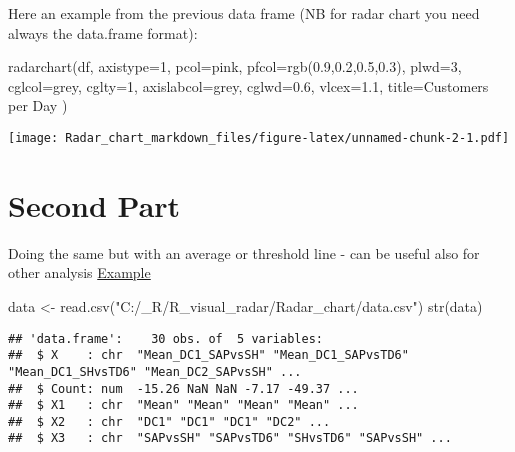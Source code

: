 \documentclass[
]{article}
\newenvironment{Shaded}{\begin{snugshade}}{\end{snugshade}}
\newcommand{\AttributeTok}[1]{\textcolor[rgb]{0.77,0.63,0.00}{#1}}
\newcommand{\DecValTok}[1]{\textcolor[rgb]{0.00,0.00,0.81}{#1}}
\newcommand{\FloatTok}[1]{\textcolor[rgb]{0.00,0.00,0.81}{#1}}
\newcommand{\FunctionTok}[1]{\textcolor[rgb]{0.00,0.00,0.00}{#1}}
\newcommand{\NormalTok}[1]{#1}
\newcommand{\OtherTok}[1]{\textcolor[rgb]{0.56,0.35,0.01}{#1}}
\newcommand{\StringTok}[1]{\textcolor[rgb]{0.31,0.60,0.02}{#1}}
\begin{document}
Here an example from the previous data frame (NB for radar chart you
need always the data.frame format):

\begin{Shaded}
\begin{Highlighting}[]
\FunctionTok{radarchart}\NormalTok{(df,}
           \AttributeTok{axistype=}\DecValTok{1}\NormalTok{, }
           \AttributeTok{pcol=}\StringTok{\textquotesingle{}pink\textquotesingle{}}\NormalTok{,}
           \AttributeTok{pfcol=}\FunctionTok{rgb}\NormalTok{(}\FloatTok{0.9}\NormalTok{,}\FloatTok{0.2}\NormalTok{,}\FloatTok{0.5}\NormalTok{,}\FloatTok{0.3}\NormalTok{),}
           \AttributeTok{plwd=}\DecValTok{3}\NormalTok{, }
           \AttributeTok{cglcol=}\StringTok{\textquotesingle{}grey\textquotesingle{}}\NormalTok{,}
           \AttributeTok{cglty=}\DecValTok{1}\NormalTok{,}
           \AttributeTok{axislabcol=}\StringTok{\textquotesingle{}grey\textquotesingle{}}\NormalTok{,}
           \AttributeTok{cglwd=}\FloatTok{0.6}\NormalTok{,}
           \AttributeTok{vlcex=}\FloatTok{1.1}\NormalTok{,}
           \AttributeTok{title=}\StringTok{\textquotesingle{}Customers per Day\textquotesingle{}}
\NormalTok{)}
\end{Highlighting}
\end{Shaded}

\texttt{[image: Radar\_chart\_markdown\_files/figure-latex/unnamed-chunk-2-1.pdf]}

\hypertarget{second-part}{%
\section{Second Part}\label{second-part}}

Doing the same but with an average or threshold line - can be useful
also for other analysis
\href{https://stackoverflow.com/questions/50353923/generate-radar-charts-with-ggplot2}{Example}

\begin{Shaded}
\begin{Highlighting}[]
\NormalTok{data }\OtherTok{\textless{}{-}} \FunctionTok{read.csv}\NormalTok{(}\StringTok{"C:/\_R/R\_visual\_radar/Radar\_chart/data.csv"}\NormalTok{)}
\FunctionTok{str}\NormalTok{(data)}
\end{Highlighting}
\end{Shaded}

\begin{verbatim}
## 'data.frame':    30 obs. of  5 variables:
##  $ X    : chr  "Mean_DC1_SAPvsSH" "Mean_DC1_SAPvsTD6" "Mean_DC1_SHvsTD6" "Mean_DC2_SAPvsSH" ...
##  $ Count: num  -15.26 NaN NaN -7.17 -49.37 ...
##  $ X1   : chr  "Mean" "Mean" "Mean" "Mean" ...
##  $ X2   : chr  "DC1" "DC1" "DC1" "DC2" ...
##  $ X3   : chr  "SAPvsSH" "SAPvsTD6" "SHvsTD6" "SAPvsSH" ...
\end{verbatim}
\end{document}
